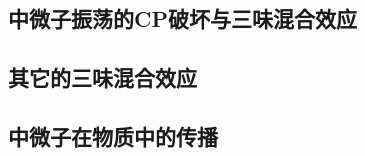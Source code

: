 \documentclass{article}
\begin{document}
		
	
	
	
	
	
	
	\subsection{中微子振荡的CP破坏与三味混合效应\label{2.3}}
	\subsection{其它的三味混合效应}
	\subsection{中微子在物质中的传播\label{2.5}}
	\newpage
	\printbibliography
\end{document}
